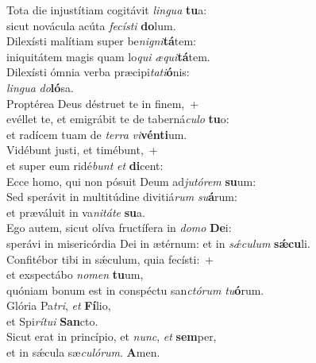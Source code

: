 \evenverse Tota die injustítiam cogitávit \textit{lin}\textit{gua} \textbf{tu}a:~\*\\
\evenverse sicut novácula acúta \textit{fe}\textit{cí}\textit{sti} \textbf{do}lum.\\
\oddverse Dilexísti malítiam super be\textit{ni}\textit{gni}\textbf{tá}tem:~\*\\
\oddverse iniquitátem magis quam lo\textit{qui} \textit{æ}\textit{qui}\textbf{tá}tem.\\
\evenverse Dilexísti ómnia verba præcipi\textit{ta}\textit{ti}\textbf{ó}nis:~\*\\
\evenverse \textit{lin}\textit{gua} \textit{do}\textbf{ló}sa.\\
\oddverse Proptérea Deus déstruet te in finem,~+\\
\oddverse  evéllet te, et emigrábit te de taberná\textit{cu}\textit{lo} \textbf{tu}o:~\*\\
\oddverse et radícem tuam de \textit{ter}\textit{ra} \textit{vi}\textbf{vén}\textbf{ti}um.\\
\evenverse Vidébunt justi, et timébunt,~+\\
\evenverse  et super eum ridé\textit{bunt} \textit{et} \textbf{di}cent:~\*\\
\evenverse Ecce homo, qui non pósuit Deum ad\textit{ju}\textit{tó}\textit{rem} \textbf{su}um:\\
\oddverse Sed sperávit in multitúdine divitiá\textit{rum} \textit{su}\textbf{á}rum:~\*\\
\oddverse et præváluit in va\textit{ni}\textit{tá}\textit{te} \textbf{su}a.\\
\evenverse Ego autem, sicut olíva fructífera in \textit{do}\textit{mo} \textbf{De}i:~\*\\
\evenverse sperávi in misericórdia Dei in ætérnum: et in \textit{sǽ}\textit{cu}\textit{lum} \textbf{sǽ}\textbf{cu}li.\\
\oddverse Confitébor tibi in sǽculum, quia fecísti:~+\\
\oddverse  et exspectábo \textit{no}\textit{men} \textbf{tu}um,~\*\\
\oddverse quóniam bonum est in conspéctu san\textit{ctó}\textit{rum} \textit{tu}\textbf{ó}rum.\\
\evenverse Glória Pa\textit{tri}, \textit{et} \textbf{Fí}lio,~\*\\
\evenverse et Spi\textit{rí}\textit{tu}\textit{i} \textbf{San}cto.\\
\oddverse Sicut erat in princípio, et \textit{nunc}, \textit{et} \textbf{sem}per,~\*\\
\oddverse et in sǽcula sæ\textit{cu}\textit{ló}\textit{rum}. \textbf{A}men.\\

